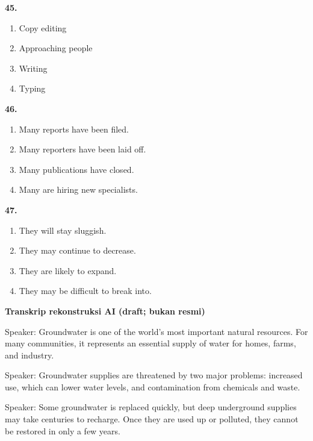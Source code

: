 \documentclass[12pt]{article}
\begin{document}
\par
\vspace{0.25\baselineskip}
\noindent\textbf{45.}
\begin{enumerate}[label=(\Alph*),leftmargin=*,itemsep=0.2em]
\item Copy editing
\item Approaching people
\item Writing
\item Typing
\end{enumerate}
\par
\vspace{0.25\baselineskip}
\noindent\textbf{46.}
\begin{enumerate}[label=(\Alph*),leftmargin=*,itemsep=0.2em]
\item Many reports have been filed.
\item Many reporters have been laid off.
\item Many publications have closed.
\item Many are hiring new specialists.
\end{enumerate}
\par
\vspace{0.25\baselineskip}
\noindent\textbf{47.}
\begin{enumerate}[label=(\Alph*),leftmargin=*,itemsep=0.2em]
\item They will stay sluggish.
\item They may continue to decrease.
\item They are likely to expand.
\item They may be difficult to break into.
\end{enumerate}
\par
\vspace{0.25\baselineskip}
\begin{exampleblock}
\textbf{Transkrip rekonstruksi AI (draft; bukan resmi)}\par
Speaker: Groundwater is one of the world's most important natural resources. For many communities, it represents an essential supply of water for homes, farms, and industry.\par
Speaker: Groundwater supplies are threatened by two major problems: increased use, which can lower water levels, and contamination from chemicals and waste.\par
Speaker: Some groundwater is replaced quickly, but deep underground supplies may take centuries to recharge. Once they are used up or polluted, they cannot be restored in only a few years.\par
\end{exampleblock}
\end{document}
